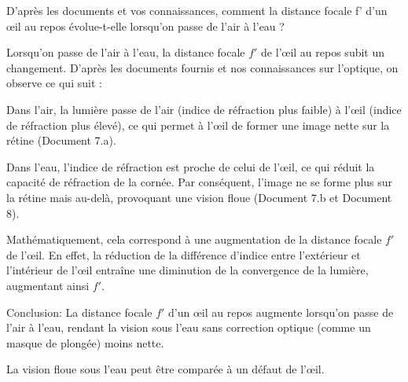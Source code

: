 \documentclass[answers]{exam}
\begin{document}
\begin{questions}
  \question[1] D'après les documents et vos connaissances, comment la distance focale f' d'un œil au repos évolue-t-elle lorsqu'on passe de l'air à l'eau ?
  

\begin{solution}
Lorsqu'on passe de l'air à l'eau, la distance focale $f'$ de l'œil au repos subit un changement. D'après les documents fournis et nos connaissances sur l'optique, on observe ce qui suit :

\begin{compactitem}
  \item Dans l'air, la lumière passe de l'air (indice de réfraction plus faible) à l'œil (indice de réfraction plus élevé), ce qui permet à l'œil de former une image nette sur la rétine (Document 7.a).
  \item Dans l'eau, l'indice de réfraction est proche de celui de l'œil, ce qui réduit la capacité de réfraction de la cornée. Par conséquent, l'image ne se forme plus sur la rétine mais au-delà, provoquant une vision floue (Document 7.b et Document 8).
  \item Mathématiquement, cela correspond à une augmentation de la distance focale $f'$ de l'œil. En effet, la réduction de la différence d'indice entre l'extérieur et l'intérieur de l'œil entraîne une diminution de la convergence de la lumière, augmentant ainsi $f'$.
\end{compactitem}

Conclusion: La distance focale $f'$ d'un œil au repos augmente lorsqu'on passe de l'air à l'eau, rendant la vision sous l'eau sans correction optique (comme un masque de plongée) moins nette.
\end{solution}

\question[1.5] La vision floue sous l'eau peut être comparée à un défaut de l'œil.
\end{questions}
\end{document}
